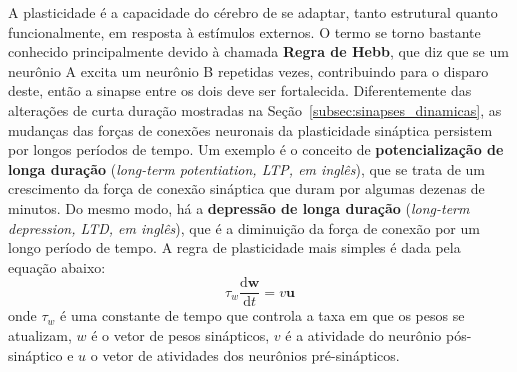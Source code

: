 A plasticidade é a capacidade do cérebro de se adaptar, tanto estrutural quanto funcionalmente, em resposta à estímulos externos.
O termo se torno bastante conhecido principalmente devido à chamada \textbf{Regra de Hebb}, que diz que se um neurônio A excita um neurônio B repetidas vezes, contribuindo para o disparo deste, então a sinapse entre os dois deve ser fortalecida.
Diferentemente das alterações de curta duração mostradas na Seção~\ref{subsec:sinapses_dinamicas}, as mudanças das forças de conexões neuronais da plasticidade sináptica persistem por longos períodos de tempo. Um exemplo é o conceito de \textbf{potencialização de longa duração} (\textit{long-term potentiation, LTP, em inglês}), que se trata de um crescimento da força de conexão sináptica que duram por algumas dezenas de minutos.
Do mesmo modo, há a \textbf{depressão de longa duração} (\textit{long-term depression, LTD, em inglês}), que é a diminuição da força de conexão por um longo período de tempo.
A regra de plasticidade mais simples é dada pela equação abaixo:
\begin{equation}\label{eq:regra_hebb}
	\tau_w\dfrac{\mathrm{d}\mathbf{w}}{\mathrm{d}t}=v\mathbf{u}
\end{equation}
onde $\tau_w$ é uma constante de tempo que controla a taxa em que os pesos se atualizam, $w$ é o vetor de pesos sinápticos, $v$ é a atividade do neurônio pós-sináptico e $u$ o vetor de atividades dos neurônios pré-sinápticos.

